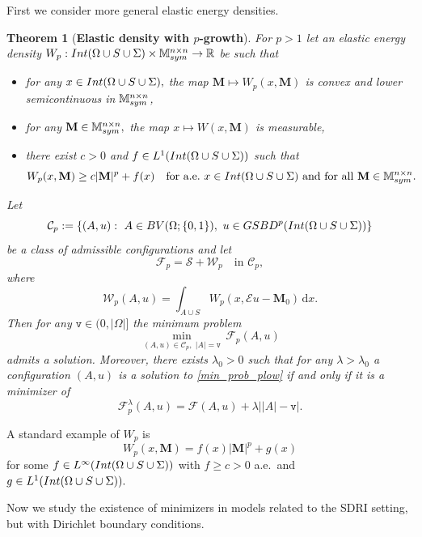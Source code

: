 \documentclass[reqno]{amsart}
\numberwithin{equation}{section}
\theoremstyle{plain}
\newtheorem{theorem}{Theorem}[section]
\theoremstyle{definition}
\newcommand{\R}{\mathbb{R}}
\newcommand{\bM}{\mathbf{M}}
\newcommand{\fm}{\mathtt{v}}
\newcommand{\cS}{\mathcal{S}}
\newcommand{\cF}{\mathcal{F}}
\newcommand{\cW}{\mathcal{W}}
\renewcommand{\d}{\mathrm{d}}
\newcommand{\str}[1]{\mathcal{E}#1}
\newcommand{\mtwo}{\mathbb{M}^{n\times n}_{\rm sym}}
\newcommand{\admissible}{\mathcal{C}}
\newcommand{\substrate}{S}
\newcommand{\Ins}[1]{{\rm Int}{(#1\cup \substrate\cup \Sigma)}}
\begin{document}
First we consider more general elastic energy densities.

\begin{theorem}[\textbf{Elastic density with $p$-growth}]\label{teo:elastic_plow}
For $p>1$ let an elastic energy density $W_p:\Ins{\Omega}\times \mtwo\to\R$ be such that
\begin{itemize}[left=15pt]
 \item[\rm(a1)] for any $x\in \Ins{\Omega},$ the map $\bM\mapsto W_p(x,\bM)$ is convex and lower semicontinuous in $\mtwo$,


 \item[\rm(a2)] for any $\bM\in\mtwo,$ the map $x\mapsto W(x,\bM)$ is measurable,

 \item[\rm(a3)] there exist $c>0$ and $f\in L^1(\Ins{\Omega})$ such that
 \begin{equation}\label{lower_boundas_papap}
 W_p(x,\bM) \ge c|\bM|^p + f(x)\quad \text{for a.e.\ $x\in \Ins{\Omega}$ and for all $\bM\in\mtwo.$}
 \end{equation}
\end{itemize}
Let 
$$
\admissible_p:=\{(A,u):\,\, A\in BV(\Omega;\{0,1\}),\,\, u\in GSBD^p(\Ins{\Omega})\}
$$
be a class of admissible configurations and let
$$
\cF_p = \cS + \cW_p\quad \text{in $\admissible_p$},
$$
where 
$$
\cW_p(A,u) = \int_{A\cup S} W_p(x,\str{u} - \bM_0)\,\d x.
$$
Then for any $\fm\in (0,|\Omega|]$ the minimum problem 
\begin{equation}\label{min_prob_plow}
\min\limits_{(A,u)\in\admissible_p,\,\,|A| = \fm} \,\cF_p(A,u) 
\end{equation}
admits a solution. Moreover, there exists $\lambda_0>0$ such that for any $\lambda>\lambda_0$ a configuration $(A,u)$ is a solution to \eqref{min_prob_plow} if and only if it is a minimizer of 
$$
\cF_p^\lambda(A,u) = \cF(A,u) + \lambda\big||A| - \fm\big|.
$$
\end{theorem}

\noindent
A standard example of $W_p$ is 
$$
W_p(x,\bM) = f(x) |\bM|^p + g(x)
$$
for some $f\in L^\infty(\Ins{\Omega})$ with $f\ge c>0$ a.e.\  and $g\in L^1(\Ins{\Omega}).$ 

Now we study the existence of minimizers in models related to the SDRI setting, but with Dirichlet boundary conditions.
\end{document}
